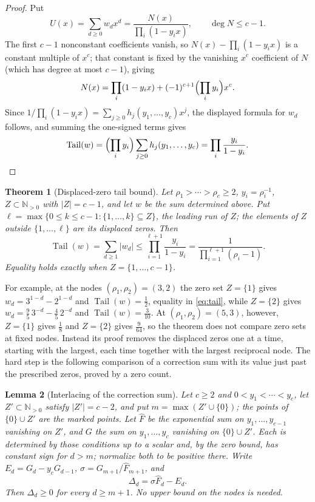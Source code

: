 \documentclass[11pt]{article}
\newtheorem{theorem}{Theorem}[section]
\newtheorem{lemma}[theorem]{Lemma}
\newcommand{\N}{\mathbb N}
\DeclareMathOperator{\Tail}{Tail}
\begin{document}
\begin{proof}
Put
\[
  U(x)=\sum_{d\ge0}w_dx^d=\frac{N(x)}{\prod_i(1-y_ix)},
  \qquad \deg N\le c-1.
\]
The first $c-1$ nonconstant coefficients vanish, so $N(x)-\prod_i(1-y_ix)$
is a constant multiple of $x^c$; that constant is fixed by the vanishing
$x^c$ coefficient of $N$ (which has degree at most $c-1$), giving
\[
  N(x)=\prod_i(1-y_ix)+(-1)^{c+1}\Bigl(\prod_i y_i\Bigr)x^c .
\]
Since $1/\prod_i(1-y_ix)=\sum_{j\ge0}h_j(y_1,\ldots,y_c)x^j$, the displayed
formula for $w_d$ follows, and summing the one-signed terms gives
\[
  \Tail(w)=\Bigl(\prod_i y_i\Bigr)\sum_{j\ge0}h_j(y_1,\ldots,y_c)
          =\prod_i\frac{y_i}{1-y_i}.
\]
\end{proof}

\begin{theorem}[Displaced-zero tail bound]\label{thm:tail}
Let $\rho_1>\cdots>\rho_c\ge2$, $y_i=\rho_i^{-1}$, $Z\subset\N_{>0}$ with
$|Z|=c-1$, and let $w$ be the sum determined above.  Put
$\ell=\max\{0\le k\le c-1:\{1,\ldots,k\}\subseteq Z\}$, the leading run of
$Z$; the elements of $Z$ outside $\{1,\ldots,\ell\}$ are its displaced zeros.
Then
\begin{equation}\label{eq:tail}
  \Tail(w)=\sum_{d\ge1}|w_d|
  \le \prod_{i=1}^{\ell+1}\frac{y_i}{1-y_i}
  =\frac{1}{\prod_{i=1}^{\ell+1}(\rho_i-1)}.
\end{equation}
Equality holds exactly when $Z=\{1,\ldots,c-1\}$.
\end{theorem}

For example, at the nodes $(\rho_1,\rho_2)=(3,2)$ the zero set $Z=\{1\}$
gives $w_d=3^{1-d}-2^{1-d}$ and $\Tail(w)=\frac12$, equality in
\eqref{eq:tail}, while $Z=\{2\}$ gives $w_d=\frac95\,3^{-d}-\frac45\,2^{-d}$
and $\Tail(w)=\frac3{10}$.  At $(\rho_1,\rho_2)=(5,3)$, however, $Z=\{1\}$
gives $\frac18$ and $Z=\{2\}$ gives $\frac9{64}$, so the theorem does not
compare zero sets at fixed nodes.  Instead its proof removes the displaced
zeros one at a time, starting with the largest, each time together with the
largest reciprocal node.  The hard step is the following comparison of a
correction sum with its value just past the prescribed zeros, proved by a
zero count.

\begin{lemma}[Interlacing of the correction sum]\label{lem:interlace}
Let $c\ge2$ and $0<y_1<\cdots<y_c$, let $Z'\subset\N_{>0}$ satisfy $|Z'|=c-2$, and put
$m=\max(Z'\cup\{0\})$; the points of $\{0\}\cup Z'$ are the marked
points.  Let $\widehat F$ be the exponential sum on
$y_1,\ldots,y_{c-1}$ vanishing on $Z'$, and $G$ the sum on
$y_1,\ldots,y_c$ vanishing on $\{0\}\cup Z'$.  Each is determined by those
conditions up to a scalar and, by the zero bound, has constant sign for
$d>m$; normalize both to be positive there.  Write $E_d=G_d-y_cG_{d-1}$,
$\sigma=G_{m+1}/\widehat F_{m+1}$, and
\[
  \Delta_d=\sigma\widehat F_d-E_d.
\]
Then $\Delta_d\ge0$ for every $d\ge m+1$.  No upper bound on the nodes is
needed.
\end{lemma}
\end{document}
